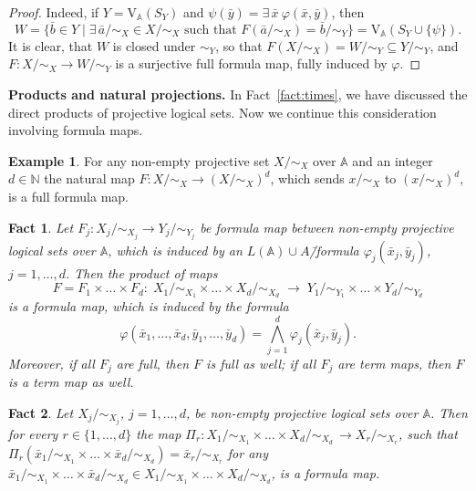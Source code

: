 \documentclass[12pt]{article}
\newtheorem{fact}{Fact}
\theoremstyle{definition}
\newtheorem{example}{Example}
\def\N{{\mathbb{N}}}
\def\MA{{\mathbb{A}}}
\def\V{{\mathrm{V}}}
\begin{document}
\begin{proof}
Indeed, if $Y=\V_\MA(S_Y)$ and $\psi(\bar y)=\exists\,\bar x\: \varphi(\bar x,\bar y)$, then 
$$
W=\{\bar b\in Y \mid \exists \, \bar a/{\sim_X}\in X/{\sim_X}\text{ such that }F(\bar a/{\sim_X})=\bar b/{\sim_Y}\}=\V_\MA(S_Y\cup\{\psi\}).
$$
It is clear, that $W$ is closed under $\sim_Y$, so that $F(X/{\sim_X})=W/{\sim_Y}\subseteq Y/{\sim_Y}$, and $F\colon X/{\sim_X}\to W/{\sim_Y}$ is a surjective full formula map, fully induced by $\varphi$.
\end{proof}

{\bf Products and natural projections.}
In Fact~\ref{fact:times}, we have discussed the direct products of projective logical sets. Now we continue this consideration involving formula maps.

\begin{example}
For any non-empty projective set $X/{\sim_X}$ over $\MA$ and an integer $d\in \N$ the natural map $F\colon X/{\sim_X}\to (X/{\sim_X})^d$, which sends $x/{\sim_X}$ to $(x/{\sim_X})^d$, is a full formula map.
\end{example}

\begin{fact}\label{fact_times}
Let $F_j\colon X_j/{\sim_{X_j}}\to Y_j/{\sim_{Y_j}}$ be formula map between non-empty projective logical sets over $\MA$, which is induced by an $L(\MA)\cup A$\=/formula $\varphi_j(\bar x_j,\bar y_j)$, $j=1,\ldots,d$. Then the product of maps 
$$
F=F_1\times\ldots\times F_d\colon \;X_1/{\sim_{X_1}}\times\ldots\times X_d/{\sim_{X_d}} \;\to \;Y_1/{\sim_{Y_1}}\times\ldots\times Y_d/{\sim_{Y_d}}
$$
is a formula map, which is induced by the formula 
$$
\varphi(\bar x_1,\ldots,\bar x_d,\bar y_1,\ldots,\bar y_d)=\bigwedge\limits_{j=1}^d \varphi_j(\bar x_j,\bar y_j).
$$
Moreover, if all $F_j$ are full, then $F$ is full as well; if all $F_j$ are term maps, then $F$ is a term map as well.
\end{fact}

\begin{fact}\label{fact:proj}
Let $X_j/{\sim_{X_j}}$, $j=1,\ldots,d$,  be non-empty projective logical sets over $\MA$. Then for every $r\in\{1,\ldots,d\}$ the map $\Pi_r\colon X_1/{\sim_{X_1}}\times\ldots\times X_d/{\sim_{X_d}}\,\to X_r/{\sim_{X_r}}$, such that  $\Pi_r(\bar x_1/{\sim_{X_1}}\times\ldots\times \bar x_d/{\sim_{X_d}})=\bar x_r/{\sim_{X_r}}$ for any $\bar x_1/{\sim_{X_1}}\times\ldots\times \bar x_d/{\sim_{X_d}}\in X_1/{\sim_{X_1}}\times\ldots\times X_d/{\sim_{X_d}}$, is a formula map. 
\end{fact}
\end{document}

